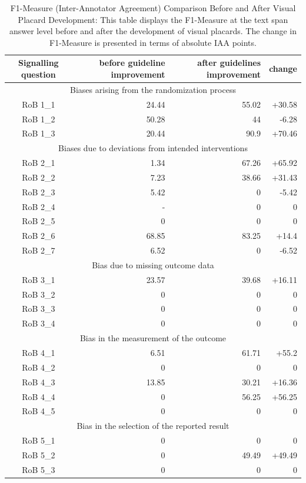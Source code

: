 \documentclass[sn-mathphys,Numbered]{sn-jnl}%
\theoremstyle{thmstyleone}%
\theoremstyle{thmstyletwo}%
\theoremstyle{thmstylethree}%
\begin{document}
\begin{table}[htb]
    \caption{F1-Measure (Inter-Annotator Agreement) Comparison Before and After Visual Placard Development: This table displays the F1-Measure at the text span answer level before and after the development of visual placards. The change in F1-Measure is presented in terms of absolute IAA points.}
    \label{tab:IAA_sq}
    \centering
    \begin{tabular}{crrr}
    \toprule[1.0pt]
        Signalling question & before guideline improvement & after guidelines improvement & change \\
    \midrule[1.0pt]
        \multicolumn{4}{c}{Biases arising from the randomization process} \\
        \hline
        RoB 1\_1 & 24.44 & 55.02 & +30.58 \\ 
        RoB 1\_2 & 50.28 & 44 & -6.28 \\ 
        RoB 1\_3 & 20.44 & 90.9 & +70.46 \\
        \hline
        \multicolumn{4}{c}{Biases due to deviations from intended interventions} \\
        \hline
        RoB 2\_1 & 1.34 & 67.26 & +65.92 \\ 
        RoB 2\_2 & 7.23 & 38.66 & +31.43 \\ 
        RoB 2\_3 & 5.42 & 0 & -5.42 \\ 
        RoB 2\_4 & - & 0 & 0 \\ 
        RoB 2\_5 & 0 & 0 & 0 \\ 
        RoB 2\_6 & 68.85 & 83.25 & +14.4 \\ 
        RoB 2\_7 & 6.52 & 0 & -6.52 \\ 
        \hline
        \multicolumn{4}{c}{Bias due to missing outcome data} \\
        \hline
        RoB 3\_1 & 23.57 & 39.68 & +16.11 \\ 
        RoB 3\_2 & 0 & 0 & 0 \\ 
        RoB 3\_3 & 0 & 0 & 0 \\ 
        RoB 3\_4 & 0 & 0 & 0 \\ 
        \hline
        \multicolumn{4}{c}{Bias in the measurement of the outcome} \\
        \hline
        RoB 4\_1 & 6.51 & 61.71 & +55.2 \\ 
        RoB 4\_2 & 0 & 0 & 0 \\ 
        RoB 4\_3 & 13.85 & 30.21 & +16.36 \\ 
        RoB 4\_4 & 0 & 56.25 & +56.25 \\ 
        RoB 4\_5 & 0 & 0 & 0 \\ 
        \hline
        \multicolumn{4}{c}{Bias in the selection of the reported result} \\
        \hline
        RoB 5\_1 & 0 & 0 & 0 \\ 
        RoB 5\_2 & 0 & 49.49 & +49.49 \\ 
        RoB 5\_3 & 0 & 0 & 0 \\
    \bottomrule[1.0pt]
    \end{tabular}
\end{table}
%
%
%
\end{document}
